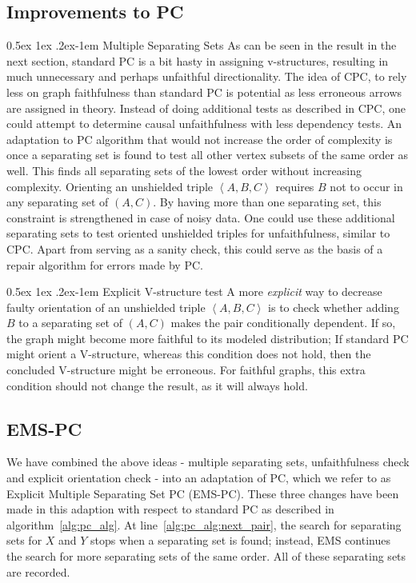 \documentclass[a4paper, english]{article}
\makeatletter
\renewcommand{\paragraph}{%
  \@startsection{paragraph}{4}%
  {\z@}{0.5ex \@plus 1ex \@minus .2ex}{-1em}%
  {\normalfont\normalsize\bfseries}%
}
\makeatother
\begin{document}
\subsection{Improvements to PC}
\paragraph{Multiple Separating Sets}
As can be seen in the result in the next section, standard PC is a bit hasty in assigning v-structures, resulting in much unnecessary and perhaps unfaithful directionality.
The idea of CPC, to rely less on graph faithfulness than standard PC is potential as less erroneous arrows are assigned in theory.
Instead of doing additional tests as described in CPC, one could attempt to determine causal unfaithfulness with less dependency tests.
An adaptation to PC algorithm that would not increase the order of complexity is once a separating set is found to test all other vertex subsets of the same order as well.
This finds all separating sets of the lowest order without increasing complexity.
Orienting an unshielded triple $\left<A,B,C\right>$ requires $B$ not to occur in any separating set of $(A,C)$.
By having more than one separating set, this constraint is strengthened in case of noisy data.
One could use these additional separating sets to test oriented unshielded triples for unfaithfulness, similar to CPC.
Apart from serving as a sanity check, this could serve as the basis of a repair algorithm for errors made by PC.

\paragraph{Explicit V-structure test}
A more \textit{explicit} way to decrease faulty orientation of an unshielded triple $\left<A,B,C\right>$ is to check whether adding $B$ to a separating set of $(A,C)$ makes the pair conditionally dependent.
If so, the graph might become more faithful to its modeled distribution; If standard PC might orient a V-structure, whereas this condition does not hold, then the concluded V-structure might be erroneous.
For faithful graphs, this extra condition should not change the result, as it will always hold.

\subsection{EMS-PC}
We have combined the above ideas - multiple separating sets, unfaithfulness check and explicit orientation check - into an adaptation of PC, which we refer to as Explicit Multiple Separating Set PC (EMS-PC).
These three changes have been made in this adaption with respect to standard PC as described in algorithm~\ref{alg:pc_alg}.
At line~\ref{alg:pc_alg:next_pair}, the search for separating sets for $X$ and $Y$ stops when a separating set is found; instead, EMS continues the search for more separating sets of the same order.
All of these separating sets are recorded.
\end{document}

